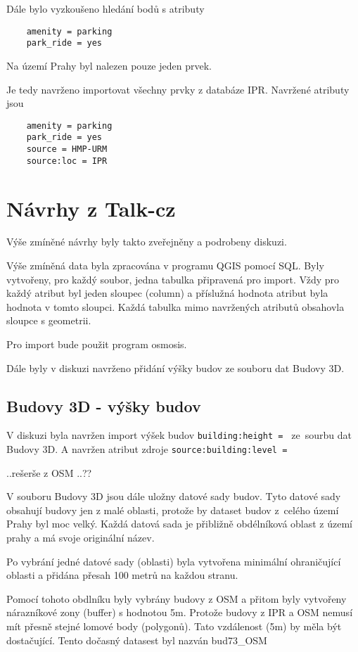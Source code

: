 Dále bylo vyzkoušeno hledání bodů s atributy 
\begin{verbatim}
    amenity = parking
    park_ride = yes
\end{verbatim}
Na území Prahy byl nalezen pouze jeden prvek.

Je tedy navrženo importovat všechny prvky z databáze IPR.
Navržené atributy jsou
\begin{verbatim}
    amenity = parking
    park_ride = yes
    source = HMP-URM
    source:loc = IPR
\end{verbatim}


\section{Návrhy z Talk-cz}
\label{Návrhy z Talk-cz}
Výše zmíněné návrhy byly takto zveřejněny a podrobeny diskuzi.

Výše zmíněná data byla zpracována v programu QGIS pomocí 
SQL. Byly vytvořeny, pro každý soubor, jedna tabulka připravená pro import.
Vždy pro každý atribut byl jeden sloupec (column) a příslužná hodnota atribut 
byla hodnota v tomto sloupci.
Každá tabulka mimo navržených atributů obsahovla sloupce s geometrii. 

Pro import  bude použit program osmosis.

Dále byly v diskuzi navrženo přidání výšky budov ze souboru dat Budovy 3D.

\subsection{Budovy 3D - výšky budov}
\label{Budovy 3D - výšky budov}
V diskuzi byla navržen import výšek budov {\tt building:height~= }
ze~sourbu dat Budovy 3D. 
A navržen atribut zdroje {\tt source:building:level~= }

..rešerše z OSM ..??

V souboru Budovy 3D jsou dále uložny datové sady budov.
Tyto datové sady obsahují budovy jen z malé oblasti, protože by dataset budov
z~celého území Prahy byl moc velký.
Každá datová sada je přibližně obdélníková oblast z území prahy
a má svoje originální název.

Po vybrání jedné datové sady (oblasti) byla vytvořena minimální
ohraničující oblasti a přidána přesah 100 metrů na každou stranu.

Pomocí tohoto obdlníku byly vybrány budovy z OSM a přitom byly vytvořeny
nárazníkové zony (buffer) s hodnotou 5m. Protože budovy z IPR a OSM
nemusí mít přesně stejné lomové body (polygonů). Tato vzdálenost (5m)
by měla být dostačující.
Tento dočasný datasest byl nazván {bud73_OSM}

